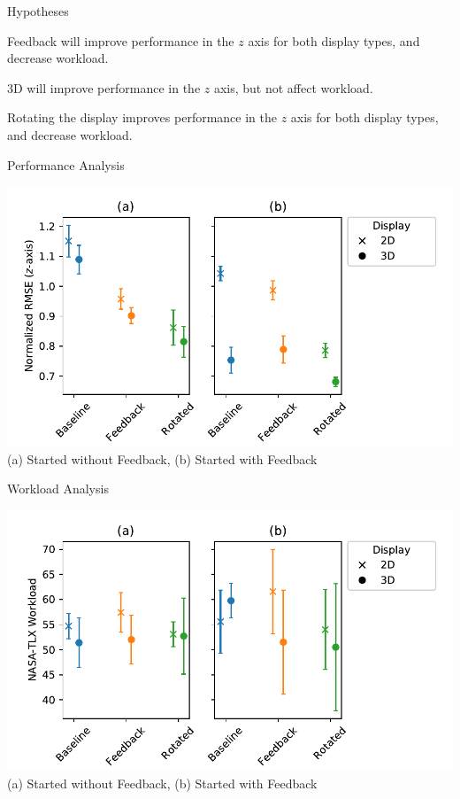 \documentclass[10pt]{beamer}
\begin{document}
\begin{frame}[fragile]{Hypotheses}
  \begin{description}[align=left]
    \item [H1] Feedback will improve performance in the $z$ axis for both display types, and decrease workload.
    \item [H2] 3D will improve performance in the $z$ axis, but not affect workload.
    \item [H3] Rotating the display improves performance in the $z$ axis for both display types, and decrease workload.
  \end{description}
\end{frame}

\begin{frame}[fragile]{Performance Analysis}
  \begin{center}
    \includegraphics[width=\linewidth]{../img/x_design_y_zrmse_hue_device_col_cbf_first.pdf}\\
    (a) Started without Feedback, (b) Started with Feedback
  \end{center}
\end{frame}

\begin{frame}[fragile]{Workload Analysis}
  \begin{center}
    \includegraphics[width=\linewidth]{../img/x_design_y_tlx_hue_device_col_cbf_first.pdf}\\
    (a) Started without Feedback, (b) Started with Feedback
  \end{center}
\end{frame}
\end{document}

